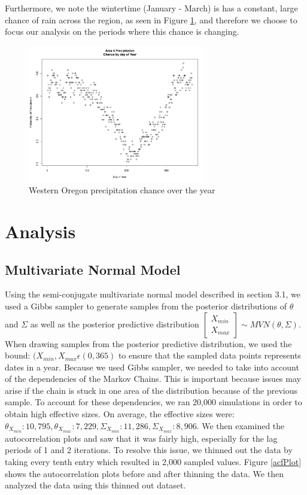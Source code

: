 \documentclass{article}
\begin{document}
Furthermore, we note the wintertime (January - March) is has a constant, large chance of rain across the region, as seen in Figure \ref{fig:area4}, and therefore we choose to focus our analysis on the periods where this chance is changing.

\begin{figure}[h!]
\centering
\includegraphics[width = .4\textwidth, height = 6cm]{Area4PrecipByDay}
\caption{Western Oregon precipitation chance over the year}
\label{fig:area4}
\end{figure}


\section{Analysis}

\subsection{Multivariate Normal Model}
Using the semi-conjugate multivariate normal model described in section 3.1, we used a Gibbs sampler to generate samples from the posterior distributions of $\theta$ and $\Sigma$ as well as the posterior predictive distribution $\begin{bmatrix} X_{min} \\ X_{max} \end{bmatrix}  \sim MVN(\theta, \Sigma)$. When drawing samples from the posterior predictive distribution, we used the bound: $(X_{min} ,X_{max} \epsilon (0,365)$ to ensure that the sampled data points represents dates in a year. Because we used Gibbs sampler, we needed to take into account of the dependencies of the Markov Chains. This is important because issues may arise if the chain is stuck in one area of the distribution because of the previous sample. To account for these dependencies, we ran 20,000 simulations in order to obtain high effective sizes. On average, the effective sizes were: $\theta_{X_{min}} : 10,795,  \theta_{X_{max}}: 7,229, \Sigma_{X_{min}}: 11,286, \Sigma_{X_{max}}: 8,906$. We then examined the autocorrelation plots and saw that it was fairly high, especially for the lag periods of 1 and 2 iterations. To resolve this issue, we thinned out the data by taking every tenth entry which resulted in 2,000 sampled values. Figure \ref{acfPlot} shows the autocorrelation plots before and after thinning the data. We then analyzed the data using this thinned out dataset.
\end{document}
